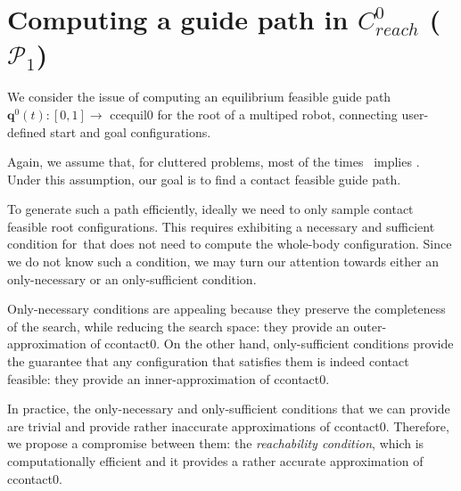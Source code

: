 \section{Computing a guide path in $C^0_{reach}$ ($\mathcal{P}_1$) }
\label{rbprm}

We consider the issue of computing an \gls{equilibrium feasible} guide path $\mathbf{q}^0(t) : [0,1] \longrightarrow$ \gls{ccequil0} for the root of a multiped robot, connecting user-defined start and goal configurations.

Again, we assume that, for \gls{cluttered} problems, most of the times \contactfeasibility\, implies \equilibriumfeasibility.
Under this assumption, our goal is to find a \gls{contact feasible} guide path.

To generate such a path efficiently, ideally we need to only sample \gls{contact feasible} root configurations.
This requires exhibiting a necessary and sufficient condition for \contactfeasibility\,that does not need to compute the whole-body configuration.
Since we do not know such a condition, we may turn our attention towards either an only-necessary or an only-sufficient condition.

Only-necessary conditions are appealing because they preserve the completeness of the search, while reducing 
the search space: they provide an outer-approximation of \gls{ccontact0}.
On the other hand, only-sufficient conditions provide the guarantee that any configuration that satisfies them is indeed \gls{contact feasible}:
they provide an inner-approximation of \gls{ccontact0}.

In practice, the only-necessary and only-sufficient conditions that we can provide are trivial and provide rather inaccurate approximations of \gls{ccontact0}.
Therefore, we propose a compromise between them: the \textit{reachability condition}, which is computationally efficient
and it provides a rather accurate approximation of \gls{ccontact0}. %



